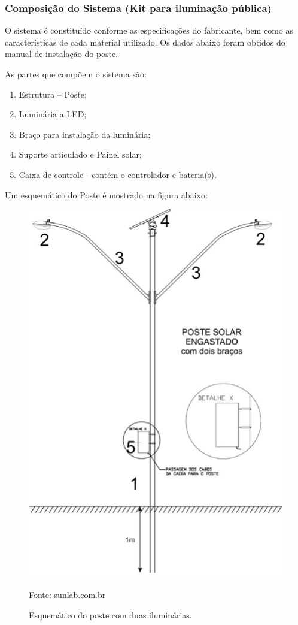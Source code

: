 \subsubsection{Composição do Sistema (Kit para iluminação pública)}

	O sistema é  constituído conforme as especificações do fabricante, bem como as características de cada material utilizado. Os dados abaixo foram obtidos do manual de instalação do poste.
	
	As partes que compõem o sistema são:

\begin{enumerate}
	\item Estrutura – Poste; 
	\item Luminária a LED; 
	\item Braço para instalação da luminária; 
	\item Suporte articulado e Painel solar; 
	\item Caixa de controle - contém o controlador e bateria(s).
\end{enumerate}

	Um esquemático do Poste é mostrado na figura abaixo:
	
\begin{figure}[H]
	 \centering
	\label{Esquemático do poste com duas iluminárias}
	 \includegraphics[keepaspectratio=true,scale=0.8]{postes/6.png}
	 \caption{Esquemático do poste com duas iluminárias.}
	 \small{Fonte: sunlab.com.br}
\end{figure}	
	
